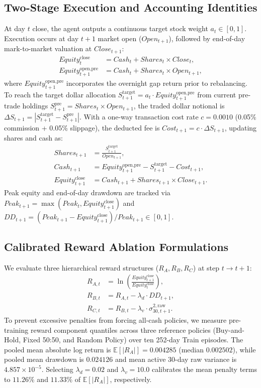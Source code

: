 \documentclass[10pt,twocolumn,conference]{IEEEtran}
\begin{document}
\subsection{Two-Stage Execution and Accounting Identities}
At day $t$ close, the agent outputs a continuous target stock weight $a_t \in [0, 1]$. Execution occurs at day $t+1$ market open ($Open_{t+1}$), followed by end-of-day mark-to-market valuation at $Close_{t+1}$:
\begin{align}
    Equity_t^{\text{close}} &= Cash_t + Shares_t \times Close_t, \\
    Equity_{t+1}^{\text{open,pre}} &= Cash_t + Shares_t \times Open_{t+1},
\end{align}
where $Equity_{t+1}^{\text{open,pre}}$ incorporates the overnight gap return prior to rebalancing. To reach the target dollar allocation $S_{t+1}^{\text{target}} = a_t \cdot Equity_{t+1}^{\text{open,pre}}$ from current pre-trade holdings $S_{t+1}^{\text{pre}} = Shares_t \times Open_{t+1}$, the traded dollar notional is $\Delta S_{t+1} = |S_{t+1}^{\text{target}} - S_{t+1}^{\text{pre}}|$. With a one-way transaction cost rate $c = 0.0010$ (0.05\% commission + 0.05\% slippage), the deducted fee is $Cost_{t+1} = c \cdot \Delta S_{t+1}$, updating shares and cash as:
\begin{align}
    Shares_{t+1} &= \frac{S_{t+1}^{\text{target}}}{Open_{t+1}}, \\
    Cash_{t+1} &= Equity_{t+1}^{\text{open,pre}} - S_{t+1}^{\text{target}} - Cost_{t+1}, \\
    Equity_{t+1}^{\text{close}} &= Cash_{t+1} + Shares_{t+1} \times Close_{t+1}.
\end{align}
Peak equity and end-of-day drawdown are tracked via $Peak_{t+1} = \max(Peak_t, Equity_{t+1}^{\text{close}})$ and $DD_{t+1} = (Peak_{t+1} - Equity_{t+1}^{\text{close}}) / Peak_{t+1} \in [0, 1]$.

\subsection{Calibrated Reward Ablation Formulations}
We evaluate three hierarchical reward structures ($R_A, R_B, R_C$) at step $t \rightarrow t+1$:
\begin{align}
    R_{A,t} &= \ln\!\left(\frac{Equity_{t+1}^{\text{close}}}{Equity_t^{\text{close}}}\right), \\
    R_{B,t} &= R_{A,t} - \lambda_d \cdot DD_{t+1}, \\
    R_{C,t} &= R_{B,t} - \lambda_v \cdot \sigma_{30,t+1}^{2,\text{raw}}.
\end{align}
To prevent excessive penalties from forcing all-cash policies, we measure pre-training reward component quantiles across three reference policies (Buy-and-Hold, Fixed 50:50, and Random Policy) over ten 252-day Train episodes. The pooled mean absolute log return is $\mathbb{E}[|R_A|] = 0.004285$ (median $0.002502$), while pooled mean drawdown is $0.024126$ and mean active 30-day raw variance is $4.857 \times 10^{-5}$. Selecting $\lambda_d = 0.02$ and $\lambda_v = 10.0$ calibrates the mean penalty terms to $11.26\%$ and $11.33\%$ of $\mathbb{E}[|R_A|]$, respectively.
\end{document}
